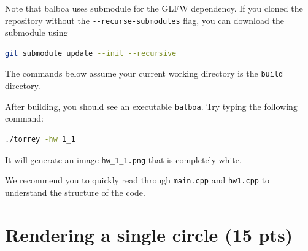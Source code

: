 Note that balboa uses submodule for the GLFW dependency. If you cloned the repository without the \lstinline{--recurse-submodules} flag, you can download the submodule using
\begin{lstlisting}[language=bash]
git submodule update --init --recursive
\end{lstlisting}

The commands below assume your current working directory is the \lstinline{build} directory.

After building, you should see an executable \lstinline{balboa}. Try typing the following command:
\begin{lstlisting}[language=bash]
  ./torrey -hw 1_1
\end{lstlisting}
It will generate an image \lstinline{hw_1_1.png} that is completely white.

We recommend you to quickly read through \lstinline{main.cpp} and \lstinline{hw1.cpp} to understand the structure of the code.

\section{Rendering a single circle (15 pts)}

